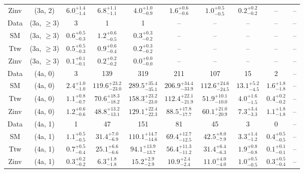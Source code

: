 \begin{table}[h!]
{\begin{tabular}{cccccccccc}
	Zinv & (3a, 2) & $6.0^{+ 1.4 }_{- 1.4 }$ & $6.8^{+ 1.1 }_{- 1.1 }$ & $4.0^{+ 1.0 }_{- 0.9 }$ & $1.6^{+ 0.6 }_{- 0.6 }$ & $1.0^{+ 0.5 }_{- 0.5 }$ & $0.2^{+ 0.2 }_{- 0.2 }$ & -- & -- \\[0.5ex] 
	Data & (3a, $\ge3$) & 3 & 1 & 1 & -- & -- & -- & -- & -- \\[0.5ex] 
	SM & (3a, $\ge3$) & $0.6^{+ 0.5 }_{- 0.3 }$ & $1.2^{+ 0.6 }_{- 0.5 }$ & $0.3^{+ 0.3 }_{- 0.2 }$ & -- & -- & -- & -- & -- \\[0.5ex] 
	Ttw & (3a, $\ge3$) & $0.5^{+ 0.5 }_{- 0.3 }$ & $0.9^{+ 0.6 }_{- 0.4 }$ & $0.2^{+ 0.3 }_{- 0.2 }$ & -- & -- & -- & -- & -- \\[0.5ex] 
	Zinv & (3a, $\ge3$) & $0.1^{+ 0.1 }_{- 0.1 }$ & $0.2^{+ 0.2 }_{- 0.2 }$ & $0.0^{+ 0.0 }_{- 0.0 }$ & -- & -- & -- & -- & -- \\[0.5ex] 
	Data & (4a, 0) & 3 & 139 & 319 & 211 & 107 & 15 & 2 & -- \\[0.5ex] 
	SM & (4a, 0) & $2.4^{+ 1.0 }_{- 1.0 }$ & $119.6^{+ 23.2 }_{- 23.0 }$ & $289.5^{+ 35.4 }_{- 35.1 }$ & $206.9^{+ 34.4 }_{- 33.9 }$ & $112.6^{+ 24.6 }_{- 24.5 }$ & $13.1^{+ 5.2 }_{- 4.5 }$ & $1.6^{+ 1.8 }_{- 1.8 }$ & -- \\[0.5ex] 
	Ttw & (4a, 0) & $1.1^{+ 0.8 }_{- 0.7 }$ & $70.6^{+ 18.3 }_{- 18.2 }$ & $158.3^{+ 23.2 }_{- 23.0 }$ & $112.4^{+ 22.1 }_{- 21.9 }$ & $51.9^{+ 10.1 }_{- 10.0 }$ & $4.0^{+ 1.6 }_{- 1.5 }$ & $0.4^{+ 0.2 }_{- 0.2 }$ & -- \\[0.5ex] 
	Zinv & (4a, 0) & $1.2^{+ 0.6 }_{- 0.6 }$ & $48.8^{+ 13.2 }_{- 13.1 }$ & $129.1^{+ 22.4 }_{- 22.3 }$ & $88.5^{+ 17.8 }_{- 17.7 }$ & $60.1^{+ 21.0 }_{- 20.9 }$ & $7.3^{+ 3.4 }_{- 3.3 }$ & $1.1^{+ 1.8 }_{- 1.8 }$ & -- \\[0.5ex] 
	Data & (4a, 1) & 1 & 47 & 151 & 81 & 45 & 3 & 0 & -- \\[0.5ex] 
	SM & (4a, 1) & $1.1^{+ 0.5 }_{- 0.5 }$ & $31.4^{+ 7.0 }_{- 6.9 }$ & $110.1^{+ 14.7 }_{- 14.6 }$ & $69.4^{+ 12.7 }_{- 12.5 }$ & $42.5^{+ 8.0 }_{- 7.9 }$ & $3.3^{+ 1.4 }_{- 1.2 }$ & $0.4^{+ 0.5 }_{- 0.5 }$ & -- \\[0.5ex] 
	Ttw & (4a, 1) & $0.7^{+ 0.5 }_{- 0.4 }$ & $25.1^{+ 6.6 }_{- 6.6 }$ & $94.1^{+ 13.9 }_{- 13.7 }$ & $56.4^{+ 11.3 }_{- 11.2 }$ & $31.4^{+ 6.4 }_{- 6.3 }$ & $1.9^{+ 0.8 }_{- 0.8 }$ & $0.1^{+ 0.1 }_{- 0.1 }$ & -- \\[0.5ex] 
	Zinv & (4a, 1) & $0.3^{+ 0.2 }_{- 0.2 }$ & $6.3^{+ 1.8 }_{- 1.8 }$ & $15.2^{+ 2.9 }_{- 2.9 }$ & $10.9^{+ 2.4 }_{- 2.4 }$ & $11.0^{+ 4.0 }_{- 4.0 }$ & $1.0^{+ 0.5 }_{- 0.5 }$ & $0.3^{+ 0.5 }_{- 0.4 }$ & -- \\[0.5ex] 

\end{tabular}}
\end{table}
